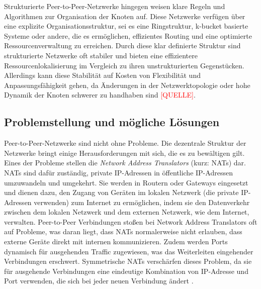 Strukturierte Peer-to-Peer-Netzwerke hingegen weisen klare Regeln und Algorithmen zur Organisation der Knoten auf. Diese Netzwerke verfügen über eine explizite Organisationsstruktur, sei es eine Ringstruktur, k-bucket basierte Systeme oder andere, die es ermöglichen, effizientes Routing und eine optimierte Ressourcenverwaltung zu erreichen. Durch diese klar definierte Struktur sind strukturierte Netzwerke oft stabiler und bieten eine effizientere Ressourcenlokalisierung im Vergleich zu ihren unstrukturierten Gegenstücken. Allerdings kann diese Stabilität auf Kosten von Flexibilität und Anpassungsfähigkeit gehen, da Änderungen in der Netzwerktopologie oder hohe Dynamik der Knoten schwerer zu handhaben sind \textcolor{red}{[QUELLE]}.



\subsection{Problemstellung und mögliche Lösungen}

Peer-to-Peer-Netzwerke sind nicht ohne Probleme. Die dezentrale Struktur der Netzwerke bringt einige Herausforderungen mit sich, die es zu bewältigen gilt. Eines der Probleme stellen die \textit{Network Address Translators} (kurz: NATs) dar. NATs sind dafür zuständig, private IP-Adressen in öffentliche IP-Adressen umzuwandeln und umgekehrt. Sie werden in Routern oder Gateways eingesetzt und dienen dazu, den Zugang von Geräten im lokalen Netzwerk (die private IP-Adressen verwenden) zum Internet zu ermöglichen, indem sie den Datenverkehr zwischen dem lokalen Netzwerk und dem externen Netzwerk, wie dem Internet, verwalten. Peer-to-Peer Verbindungen stoßen bei Network Address Translators oft auf Probleme, was daran liegt, dass NATs normalerweise nicht erlauben, dass externe Geräte direkt mit internen kommunizieren. Zudem werden Ports dynamisch für ausgehenden Traffic zugewiesen, was das Weiterleiten eingehender Verbindungen erschwert. Symmetrische NATs verschärfen dieses Problem, da sie für ausgehende Verbindungen eine eindeutige Kombination von IP-Adresse und Port verwenden, die sich bei jeder neuen Verbindung ändert \Parencite[S. 1-9]{rfc2663_NAT_Terminology}.

